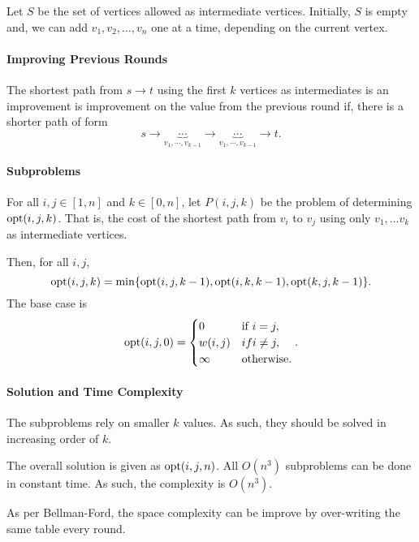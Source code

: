 Let \(S\) be the set of vertices allowed as intermediate vertices.
Initially, \(S\) is empty and, we can add \(v_1, v_2, \ldots, v_n\) one at
a time, depending on the current vertex.

\paragraph{Improving Previous Rounds}
The shortest path from \(s \to t\) using the first \(k\) vertices
as intermediates is an improvement is improvement on the value from
the previous round if, there is a shorter path of form \[
  s \to \underbrace{\cdots}_{v_1, \cdots, v_{k-1}} \to \underbrace{\cdots}_{v_1, \cdots, v_{k-1}} \to t
.\]

\paragraph{Subproblems}
For all  \(i, j \in [1, n]\) and \(k \in [0, n]\), let \(P(i, j, k)\)
be the problem of determining \(\mathrm{opt}(i, j, k)\). That is,
the cost of the shortest path from \(v_i\) to  \(v_j\) using only
\(v_1, \ldots v_k\)  as intermediate vertices.

Then, for all \(i, j\),  \[
  \mathrm{opt}(i, j, k) = \min \{
    \mathrm{opt}(i, j, k - 1),
    \mathrm{opt}(i, k, k - 1),
    \mathrm{opt}(k, j, k - 1)
  \} 
.\] 
The base case is \[
  \mathrm{opt}(i, j, 0) = \begin{cases}
    0              & \text{if } i = j, \\
    w(i, j)        &if i \neq j, \\
    \infty         & \text{otherwise}.
  \end{cases}
.\] 

\paragraph{Solution and Time Complexity}
The subproblems rely on smaller \(k\) values. As such, they should be solved
in increasing order of  \(k\).

The overall solution is given as \(\mathrm{opt}(i, j, n)\). All  \(O(n^3)\)
subproblems can be done in constant time. As such, the complexity is  \(O(n^3)\).

As per Bellman-Ford, the space complexity can be improve by over-writing the same table
every round.

